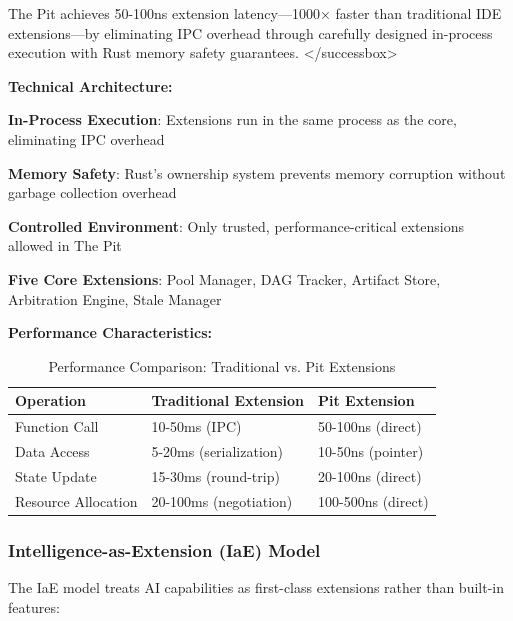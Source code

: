 \begin{successbox}
The Pit achieves 50-100ns extension latency—1000× faster than traditional IDE extensions—by eliminating IPC overhead through carefully designed in-process execution with Rust memory safety guarantees.
</successbox>

\textbf{Technical Architecture:}

\begin{expandedlist}
    \item \textbf{In-Process Execution}: Extensions run in the same process as the core, eliminating IPC overhead
    
    \item \textbf{Memory Safety}: Rust's ownership system prevents memory corruption without garbage collection overhead
    
    \item \textbf{Controlled Environment}: Only trusted, performance-critical extensions allowed in The Pit
    
    \item \textbf{Five Core Extensions}: Pool Manager, DAG Tracker, Artifact Store, Arbitration Engine, Stale Manager
\end{expandedlist}

\textbf{Performance Characteristics:}

\begin{table}[ht]
\centering
\begin{tabular}{@{}lll@{}}
\toprule
\textbf{Operation} & \textbf{Traditional Extension} & \textbf{Pit Extension} \\
\midrule
Function Call & 10-50ms (IPC) & 50-100ns (direct) \\
Data Access & 5-20ms (serialization) & 10-50ns (pointer) \\
State Update & 15-30ms (round-trip) & 20-100ns (direct) \\
Resource Allocation & 20-100ms (negotiation) & 100-500ns (direct) \\
\bottomrule
\end{tabular}
\caption{Performance Comparison: Traditional vs. Pit Extensions}
\label{tab:pit-performance}
\end{table}

\subsubsection{Intelligence-as-Extension (IaE) Model}

The IaE model treats AI capabilities as first-class extensions rather than built-in features:


\end{successbox}

